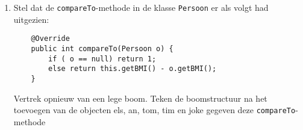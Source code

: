 \begin{oef}
\begin{enumerate}
\item Stel dat de \verb+compareTo+-methode in de klasse \verb+Persoon+ er als volgt had uitgezien: 
\begin{lstlisting}
	@Override
	public int compareTo(Persoon o) {
		if ( o == null) return 1;
		else return this.getBMI() - o.getBMI();
	}
\end{lstlisting}

 
Vertrek opnieuw van een lege boom. Teken de boomstructuur na het toevoegen van de objecten els, an, tom, tim en joke gegeven deze \verb+compareTo+-methode 

\end{enumerate}

\begin{opl}

\end{opl}
\end{oef}



